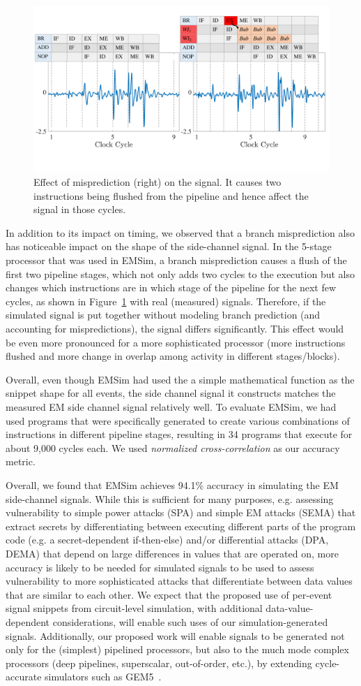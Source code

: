 \begin{figure}
	\centering
	\includegraphics[width=0.4\columnwidth,clip]{figure/mise2.pdf}
	\caption{Effect of misprediction (right) on the signal. It causes two instructions being flushed from the pipeline and hence affect the signal in those cycles.}
	\label{fig:mis}
\end{figure}
In addition to its impact on timing, we observed that a branch misprediction also has noticeable impact on the shape of the side-channel signal. In the 5-stage processor that was used in EMSim, a branch misprediction causes a flush of the first two pipeline stages, which not only adds two cycles to the execution but also changes which instructions are in which stage of the pipeline for the next few cycles, as shown in Figure~\ref{fig:mis} with real (measured) signals. Therefore, if the simulated signal is put together without modeling branch prediction (and accounting for mispredictions), the signal differs significantly. This effect would be even more pronounced for a more sophisticated processor (more instructions flushed and more change in overlap among activity in different stages/blocks).

Overall, even though EMSim had used the a simple mathematical function as the snippet shape for all events, the side channel signal it constructs matches the measured EM side channel signal relatively well. To evaluate EMSim, we had used programs that were specifically generated to create various combinations of instructions in different pipeline stages, resulting in 34 programs that execute for about 9,000 cycles each. We used \textit{normalized cross-correlation} as our accuracy metric.

Overall, we found that EMSim achieves 94.1\% accuracy in simulating the EM side-channel signals. While this is sufficient for many purposes, e.g. assessing vulnerability to simple power attacks (SPA) and simple EM attacks (SEMA) that extract secrets by differentiating between executing different parts of the program code (e.g. a secret-dependent if-then-else) and/or differential attacks (DPA, DEMA) that depend on large differences in values that are operated on, more accuracy is likely to be needed for simulated signals to be used to assess vulnerability to more sophisticated attacks that differentiate between data values that are similar to each other. We expect that the proposed use of per-event signal snippets from circuit-level simulation, with additional data-value-dependent considerations, will enable such uses of our simulation-generated signals. Additionally, our proposed work will enable signals to be generated not only for the (simplest) pipelined processors, but also to the much mode complex processors (deep pipelines, superscalar, out-of-order, etc.), by extending cycle-accurate simulators such as GEM5~\cite{gem5}.

